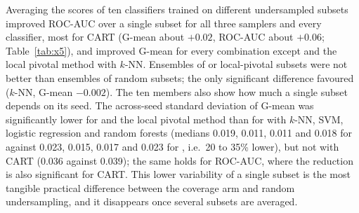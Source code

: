 Averaging the scores of ten classifiers trained on different undersampled subsets improved ROC-AUC over a single subset for all three samplers and every classifier, most for CART (G-mean about $+0.02$, ROC-AUC about $+0.06$; Table~\ref{tab:x5}), and improved G-mean for every combination except \MUSCS{} and the local pivotal method with $k$-NN. Ensembles of \MUSCS{} or local-pivotal subsets were not better than ensembles of random subsets; the only significant difference favoured \RUS{} ($k$-NN, G-mean $-0.002$). The ten members also show how much a single subset depends on its seed. The across-seed standard deviation of G-mean was significantly lower for \MUSCS{} and the local pivotal method than for \RUS{} with $k$-NN, SVM, logistic regression and random forests (medians 0.019, 0.011, 0.011 and 0.018 for \MUSCS{} against 0.023, 0.015, 0.017 and 0.023 for \RUS, i.e.\ 20 to 35\% lower), but not with CART (0.036 against 0.039); the same holds for ROC-AUC, where the reduction is also significant for CART. This lower variability of a single subset is the most tangible practical difference between the coverage arm and random undersampling, and it disappears once several subsets are averaged.


